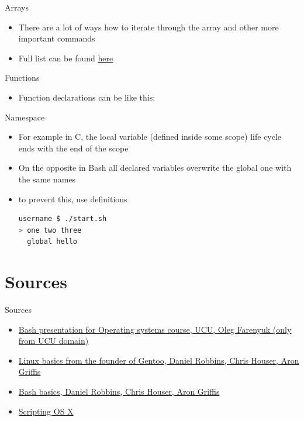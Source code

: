\documentclass[usenames,dvipsnames,10pt,aspectratio=169]{beamer}
\begin{document}
\begin{frame}[fragile]{Arrays}
    \begin{itemize}
        \item There are a lot of ways how to iterate through the array and other more important commands
        
        \item Full list can be found \href{https://devhints.io/bash#arrays}{here}
    \end{itemize}
\end{frame}

\begin{frame}[fragile]{Functions}
    \begin{itemize}
        \item Function declarations can be like this:
        
    \end{itemize}
\end{frame}

\begin{frame}[fragile]{Namespace}
    \begin{itemize}
        \item For example in C, the local variable (defined inside some scope) life cycle ends with the end of the scope
        \item On the opposite in Bash all declared variables overwrite the global one with the same names
        \item to prevent this, use  definitions
        
        \begin{lstlisting}[language=Bash, style=shellstyle]
username $ ./start.sh
> one two three 
  global hello\end{lstlisting}
    \end{itemize}
\end{frame}

\section{Sources}
\begin{frame}{Sources}
\begin{itemize}
    \item \href{https://cms.ucu.edu.ua/pluginfile.php/181565/mod_resource/content/3/os_p01_bash.pdf}{Bash presentation for Operating systems course, UCU, Oleg Farenyuk (only from UCU domain)}
    \item \href{https://www.funtoo.org/Linux_Fundamentals,_Part_1}{Linux basics from the founder of Gentoo, Daniel Robbins, Chris Houser, Aron Griffis}
    \item \href{https://www.funtoo.org/Bash_by_Example,_Part_1}{Bash basics, Daniel Robbins, Chris Houser, Aron Griffis}
    \item \href {https://scriptingosx.com/}{Scripting OS X}
\end{itemize}    
\end{frame}
\end{document}
